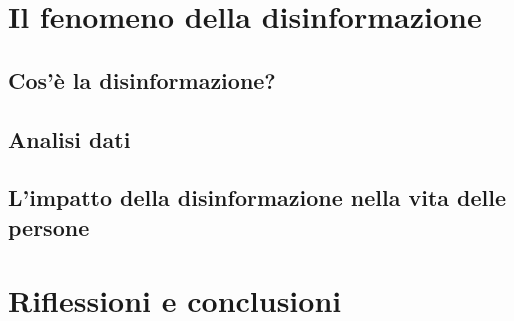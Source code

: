 \documentclass{article}
\begin{document}
\newpage \section{Il fenomeno della disinformazione}

\flushleft \subsection{Cos'è la disinformazione?}

\flushleft \subsection{Analisi dati}

\flushleft \subsection{L'impatto della disinformazione nella vita delle persone}

\centering
\newpage\section{Riflessioni e conclusioni}
\end{document}
